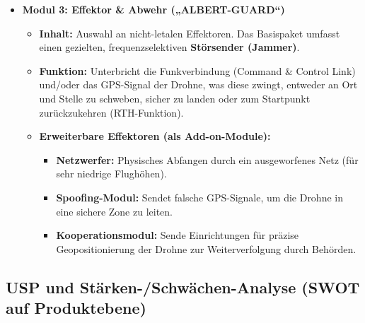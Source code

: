 \documentclass[11pt,a4paper]{article}
\begin{document}
\begin{itemize}
    \item \textbf{Modul 3: Effektor \& Abwehr („ALBERT-GUARD“)}
    \begin{itemize}
        \item \textbf{Inhalt:} Auswahl an nicht-letalen Effektoren. Das Basispaket umfasst einen gezielten, frequenzselektiven \textbf{Störsender (Jammer)}.
        \item \textbf{Funktion:} Unterbricht die Funkverbindung (Command \& Control Link) und/oder das GPS-Signal der Drohne, was diese zwingt, entweder an Ort und Stelle zu schweben, sicher zu landen oder zum Startpunkt zurückzukehren (RTH-Funktion).
        \item \textbf{Erweiterbare Effektoren (als Add-on-Module):}
        \begin{itemize}
            \item \textbf{Netzwerfer:} Physisches Abfangen durch ein ausgeworfenes Netz (für sehr niedrige Flughöhen).
            \item \textbf{Spoofing-Modul:} Sendet falsche GPS-Signale, um die Drohne in eine sichere Zone zu leiten.
            \item \textbf{Kooperationsmodul:} Sende Einrichtungen für präzise Geopositionierung der Drohne zur Weiterverfolgung durch Behörden.
        \end{itemize}
    \end{itemize}
\end{itemize}

\subsection{USP und Stärken-/Schwächen-Analyse (SWOT auf Produktebene)}
\end{document}
